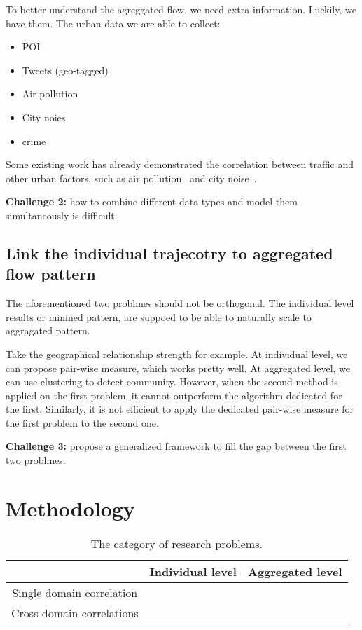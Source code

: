 \documentclass[11pt]{article}
\begin{document}
To better understand the agreggated flow, we need extra information. Luckily, we have them.
The urban data we are able to collect:
\begin{itemize}
\item POI
\item Tweets (geo-tagged)
\item Air pollution
\item City noies
\item crime
\end{itemize}

Some existing work has already demonstrated the correlation between traffic and other urban factors, such as air pollution~\cite{zheng2013u} and city noise~\cite{zheng2014diagnosing}.

\textbf{Challenge 2:} how to combine different data types and model them simultaneously is difficult.



\subsection{Link the individual trajecotry to aggregated flow pattern}

The aforementioned two problmes should not be orthogonal. The individual level results or minined pattern, are suppoed to be able to naturally scale to aggragated pattern.


Take the geographical relationship strength for example. At individual level, we can propose pair-wise measure, which works pretty well. At aggregated level, we can use clustering to detect community. However, when the second method is applied on the first problem, it cannot outperform the algorithm dedicated for the first. Similarly, it is not efficient to apply the dedicated pair-wise measure for the first problem to the second one.


\textbf{Challenge 3:} propose a generalized framework to fill the gap between the first two problmes.







\section{Methodology}




\begin{table}[h]
\centering
\caption{The category of research problems.}
\begin{tabular}{|c|c|c|}
\hline
 & Individual level & Aggregated level \\ \hline
Single domain correlation & 	&  \\ \hline
Cross domain correlations &     &  \\ \hline
\end{tabular}
\end{table}
\end{document}
